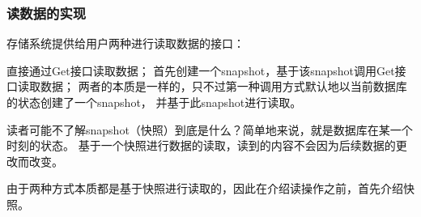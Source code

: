 		\subsubsection{读数据的实现}

	存储系统提供给用户两种进行读取数据的接口：

	直接通过Get接口读取数据；
	首先创建一个snapshot，基于该snapshot调用Get接口读取数据；
	两者的本质是一样的，只不过第一种调用方式默认地以当前数据库的状态创建了一个snapshot，
	并基于此snapshot进行读取。

	读者可能不了解snapshot（快照）到底是什么？简单地来说，就是数据库在某一个时刻的状态。
	基于一个快照进行数据的读取，读到的内容不会因为后续数据的更改而改变。
	
	由于两种方式本质都是基于快照进行读取的，因此在介绍读操作之前，首先介绍快照。

